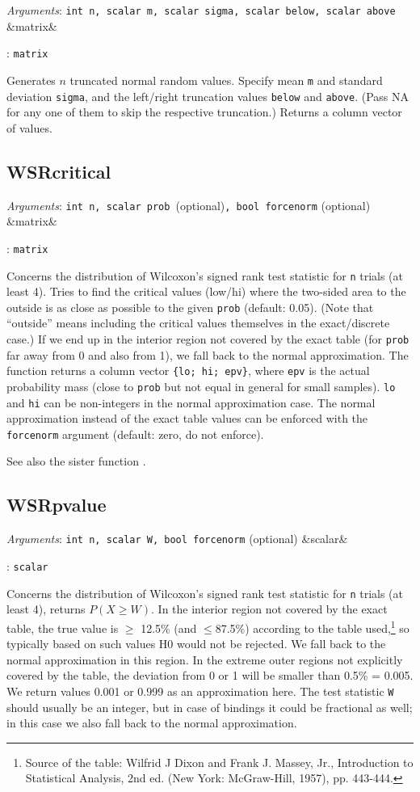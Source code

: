 \documentclass[11pt,english]{article}
\newcommand{\ArgRet}[2]{%
  {\it Arguments}: {#1}%
  \ifx&#2&%
  \else
  \par\smallskip\noindent {\it Return type}: \texttt{#2}
  \fi%
  \par\medskip\par%
  }
\begin{document}
\ArgRet{\texttt{int n, scalar m, scalar sigma, scalar below, scalar
above}}{matrix}

Generates $n$ truncated normal random values. Specify mean \texttt{m}
and standard deviation \texttt{sigma}, and the left/right truncation values
\texttt{below} and \texttt{above}. (Pass NA for any one of them to
skip the respective truncation.) Returns a column vector of values.


\subsection{WSRcritical}

\ArgRet{\texttt{int n, scalar prob }(optional)\texttt{, bool forcenorm}
(optional)}{matrix}

Concerns the distribution of Wilcoxon's signed rank test statistic for
\texttt{n} trials (at least 4). Tries to find the critical values
(low/hi) where the two-sided area to the outside is as close as
possible to the given \texttt{prob} (default: 0.05). (Note that
``outside'' means including the critical values themselves in the
exact/discrete case.) If we end up in the interior region not covered
by the exact table (for \texttt{prob} far away from 0 and also from
1), we fall back to the normal approximation. The function returns a
column vector \verb|{lo; hi; epv}|, where \texttt{epv} is the actual
probability mass (close to \texttt{prob} but not equal in general for
small samples). \texttt{lo} and \texttt{hi} can be non-integers in the normal
approximation case. The normal approximation instead of the exact
table values can be enforced with the \texttt{forcenorm} argument
(default: zero, do not enforce).

See also the sister function .

\subsection{WSRpvalue}

\ArgRet{\texttt{int n, scalar W, bool forcenorm} (optional)}{scalar}

Concerns the distribution of Wilcoxon's signed rank test statistic for
\texttt{n} trials (at least 4), returns $P(X\geq W)$. In the interior
region not covered by the exact table, the true value is $\geq$ 12.5\%
(and $\leq$87.5\%) according to the table used,\footnote{Source of the
  table: Wilfrid J Dixon and Frank J. Massey, Jr., Introduction to
  Statistical Analysis, 2nd ed. (New York: McGraw-Hill, 1957), pp.
  443-444.} so typically based on such values H0 would not be
rejected. We fall back to the normal approximation in this region. In
the extreme outer regions not explicitly covered by the table, the
deviation from 0 or 1 will be smaller than 0.5\% = 0.005. We return
values 0.001 or 0.999 as an approximation here. The test statistic
\texttt{W} should usually be an integer, but in case of bindings it
could be fractional as well; in this case we also fall back to the
normal approximation.
\end{document}

